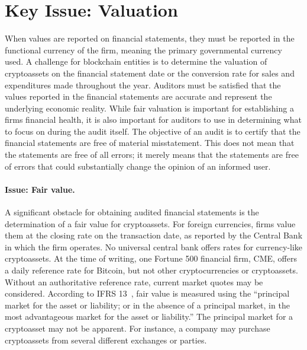 \section{Key Issue: Valuation}
When values are reported on financial statements, they must be reported in the functional currency of the firm, meaning the primary governmental currency used. A challenge for blockchain entities is to determine the valuation of cryptoassets on the financial statement date or the conversion rate for sales and expenditures made throughout the year. Auditors must be satisfied that the values reported in the financial statements are accurate and represent the underlying economic reality. While fair valuation is important for establishing a firm\textquotesingle s financial health, it is also important for auditors to use in determining what to focus on during the audit itself. The objective of an audit is to certify that the financial statements are free of material misstatement. This does not mean that the statements are free of all errors; it merely means that the statements are free of errors that could substantially change the opinion of an informed user. 

\paragraph{Issue: Fair value.} A significant obstacle for obtaining audited financial statements is the determination of a fair value for cryptoassets. For foreign currencies, firms value them at the closing rate on the transaction date, as reported by the Central Bank in which the firm operates. No universal central bank offers rates for currency-like cryptoassets. At the time of writing, one Fortune 500 financial firm, CME, offers a daily reference rate for Bitcoin, but not other cryptocurrencies or cryptoassets. Without an authoritative reference rate, current market quotes may be considered. According to IFRS 13~\cite{ifrs201113}, fair value is measured using the ``principal market for the asset or liability; or  in the absence of a principal market, in the most advantageous market for the asset or liability.'' The principal market for a cryptoasset may not be apparent. For instance, a company may purchase cryptoassets from several different exchanges or parties. 

